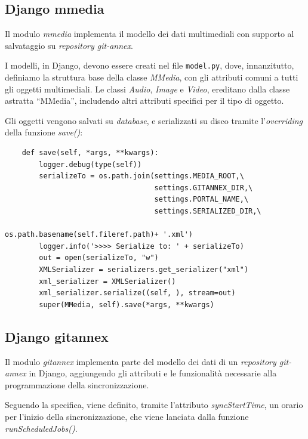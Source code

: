 \subsection{Django mmedia}

Il modulo \emph{mmedia} implementa il modello dei dati
multimediali con supporto al salvataggio su \emph{repository
  git-annex}.

I modelli, in Django, devono essere creati nel file \verb|model.py|,
dove, innanzitutto, definiamo la struttura base della classe
\emph{MMedia}, con gli attributi comuni a tutti gli oggetti
multimediali. Le classi \emph{Audio}, \emph{Image} e \emph{Video},
ereditano dalla classe astratta ``MMedia'', includendo altri attributi
specifici per il tipo di oggetto.

Gli oggetti vengono salvati su \emph{database}, e serializzati su
disco tramite l'\emph{overriding} della funzione \emph{save()}:

\lstset{language=Python}
\begin{lstlisting}
    def save(self, *args, **kwargs):
        logger.debug(type(self))
        serializeTo = os.path.join(settings.MEDIA_ROOT,\
                                   settings.GITANNEX_DIR,\
                                   settings.PORTAL_NAME,\
                                   settings.SERIALIZED_DIR,\
                                   os.path.basename(self.fileref.path)+ '.xml')
        logger.info('>>>> Serialize to: ' + serializeTo)
        out = open(serializeTo, "w")
        XMLSerializer = serializers.get_serializer("xml")
        xml_serializer = XMLSerializer()
        xml_serializer.serialize((self, ), stream=out)
        super(MMedia, self).save(*args, **kwargs)
\end{lstlisting}

\subsection{Django gitannex}

Il modulo \emph{gitannex} implementa parte del modello dei dati di un
\emph{repository git-annex} in Django, aggiungendo gli attributi e le
funzionalità necessarie alla programmazione della sincronizzazione.

Seguendo la specifica, viene definito, tramite l'attributo
\emph{syncStartTime}, un orario per l'inizio della sincronizzazione,
che viene lanciata dalla funzione \emph{runScheduledJobs()}.

